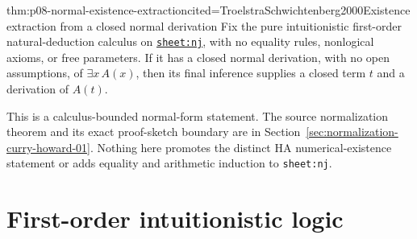 

\begin{hbtheorem}{thm:p08-normal-existence-extraction}{cited=TroelstraSchwichtenberg2000}{Existence extraction from a closed normal derivation}
Fix the pure intuitionistic first-order natural-deduction calculus on
\hyperref[sheet:nj]{\texttt{sheet:nj}}, with no equality rules, nonlogical
axioms, or free parameters.  If it has a closed normal derivation, with no open
assumptions, of \(\exists x\,A(x)\), then its final inference supplies a closed
term \(t\) and a derivation of \(A(t)\).
\end{hbtheorem}

This is a calculus-bounded normal-form statement.  The source normalization
theorem and its exact proof-sketch boundary are in
Section~\ref{sec:normalization-curry-howard-01}.  Nothing here
promotes the distinct HA numerical-existence statement or adds equality and
arithmetic induction to \texttt{sheet:nj}.

\section{First-order intuitionistic logic}

